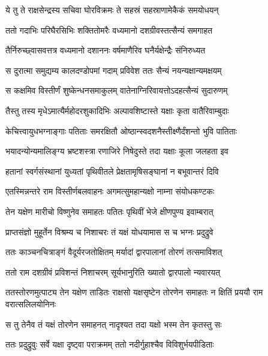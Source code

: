 \twolineshloka
{ये तु ते राक्षसेन्द्रस्य सचिवा घोरविक्रमः}
{ते सहस्रं सहस्राणामेकैकं समयोधयन्} %

\twolineshloka
{ततो गदाभिः परिघैरसिभिः शक्तितोमरैः}
{वध्यमानो दशग्रीवस्तत्सैन्यं समगाहत} %

\twolineshloka
{तैर्निरुच्छ्वासवत्तत्र वध्यमानो दशाननः}
{वर्षमाणैरिव घनैर्यक्षेन्द्रैः संनिरुध्यत} %

\twolineshloka
{स दुरात्मा समुद्यम्य कालदण्डोपमां गदाम्}
{प्रविवेश ततः सैन्यं नयन्यक्षान्यमक्षयम्} %

\twolineshloka
{स कक्षमिव विस्तीर्णं शुष्केन्धनसमाकुलम्}
{वातेनाग्निरिवायत्तोऽदहत्सैन्यं सुदारुणम्} %

\twolineshloka
{तैस्तु तस्य मृधेऽमात्यैर्महोदरशुकादिभिः}
{अल्पावशिष्टास्ते यक्षाः कृता वातैरिवाम्बुदाः} %

\twolineshloka
{केचित्त्वायुधभग्नाङ्गाः पतिताः समरक्षितौ}
{ओष्ठान्स्वदशनैस्तीक्ष्णैर्दंशन्तो भुवि पातिताः} %

\twolineshloka
{भयादन्योन्यमालिङ्ग्य भ्रष्टशस्त्रा रणाजिरे}
{निषेदुस्ते तदा यक्षाः कूला जलहता इव} %

\twolineshloka
{हतानां स्वर्गसंस्थानां युध्यतां पृथिवीतले}
{प्रेक्षतामृषिसङ्घानां न बभूवान्तरं दिवि} %

\twolineshloka
{एतस्मिन्नन्तरे राम विस्तीर्णबलवाहनः}
{अगमत्सुमहान्यक्षो नाम्ना संयोधकण्टकः} %

\twolineshloka
{तेन यक्षेण मारीचो विष्णुनेव समाहतः}
{पतितः पृथिवीं भेजे क्षीणपुण्य इवाम्बरात्} %

\twolineshloka
{प्राप्तसंज्ञो मुहूर्तेन विश्रम्य च निशाचरः}
{तं यक्षं योधयामास स च भग्नः प्रदुद्रुवे} %

\twolineshloka
{ततः काञ्चनचित्राङ्गं वैदूर्यरजतोक्षितम्}
{मर्यादां द्वारपालानां तोरणं तत्समाविशत्} %

\twolineshloka
{ततो राम दशग्रीवं प्रविशन्तं निशाचरम्}
{सूर्यभानुरिति ख्यातो द्वारपालो न्यवारयत्} %

\threelineshloka
{ततस्तोरणमुत्पाट्य तेन यक्षेण ताडितः}
{राक्षसो यक्षसृष्टेन तोरणेन समाहतः}
{न क्षितिं प्रययौ राम वरात्सलिलयोनिनः} %

\twolineshloka
{स तु तेनैव तं यक्षं तोरणेन समाहनत्}
{नादृश्यत तदा यक्षो भस्म तेन कृतस्तु सः} %

\twolineshloka
{ततः प्रदुद्रुवुः सर्वे यक्षा दृष्ट्वा पराक्रमम्}
{ततो नदीर्गुहाश्चैव विविशुर्भयपीडिताः} %


